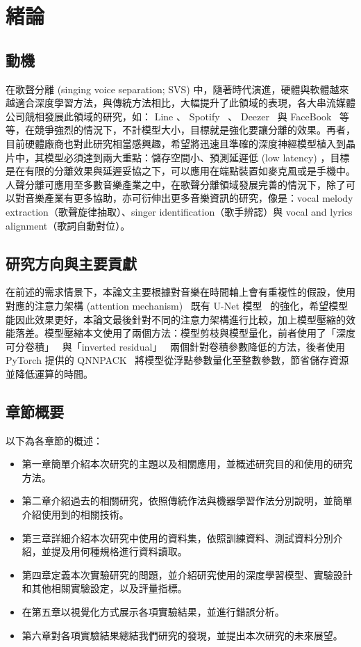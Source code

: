 \chapter{緒論}


\section{動機}
在歌聲分離 (singing voice separation; SVS) 中，隨著時代演進，硬體與軟體越來越適合深度學習方法，與傳統方法相比，大幅提升了此領域的表現，各大串流媒體公司競相發展此領域的研究，如： Line 、 Spotify~\cite{jansson2017singing} 、 Deezer~\cite{hennequin2020spleeter} 與 FaceBook~\cite{defossez2019music} 等等，在競爭強烈的情況下，不計模型大小，目標就是強化要讓分離的效果。再者，目前硬體廠商也對此研究相當感興趣，希望將迅速且準確的深度神經模型植入到晶片中，其模型必須達到兩大重點：儲存空間小、預測延遲低 (low latency) ，目標是在有限的分離效果與延遲妥協之下，可以應用在端點裝置如麥克風或是手機中。
人聲分離可應用至多數音樂產業之中，在歌聲分離領域發展完善的情況下，除了可以對音樂產業有更多協助，亦可衍伸出更多音樂資訊的研究，像是：vocal melody extraction（歌聲旋律抽取）、singer identification（歌手辨認）與 vocal and lyrics alignment（歌詞自動對位）。


\section{研究方向與主要貢獻}
在前述的需求情景下，本論文主要根據對音樂在時間軸上會有重複性的假設，使用對應的注意力架構 (attention mechanism)~\cite{vaswani2017attention,oktay2018attention,shaw2018self,liu2020voice} 既有 U-Net 模型~\cite{ronneberger2015u} 的強化，希望模型能因此效果更好，本論文最後針對不同的注意力架構進行比較，加上模型壓縮的效能落差。模型壓縮本文使用了兩個方法：模型剪枝與模型量化，前者使用了「深度可分卷積」~\cite{chollet2017xception,howard2017mobilenets} 與「inverted residual」~\cite{sandler2018mobilenetv2} 兩個針對卷積參數降低的方法，後者使用 PyTorch 提供的 QNNPACK~\cite{dukhan2018qnnpack,wu2019machine} 將模型從浮點參數量化至整數參數，節省儲存資源並降低運算的時間。

\section{章節概要}
以下為各章節的概述：
\begin{itemize}
	\item 第一章簡單介紹本次研究的主題以及相關應用，並概述研究目的和使用的研究方法。
	\item 第二章介紹過去的相關研究，依照傳統作法與機器學習作法分別說明，並簡單介紹使用到的相關技術。
	\item 第三章詳細介紹本次研究中使用的資料集，依照訓練資料、測試資料分別介紹，並提及用何種規格進行資料讀取。
	\item 第四章定義本次實驗研究的問題，並介紹研究使用的深度學習模型、實驗設計和其他相關實驗設定，以及評量指標。
	\item 在第五章以視覺化方式展示各項實驗結果，並進行錯誤分析。
	\item 第六章對各項實驗結果總結我們研究的發現，並提出本次研究的未來展望。
\end{itemize}